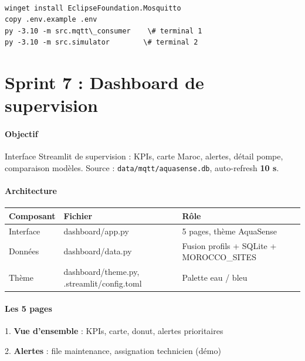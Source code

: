 \documentclass[11pt,a4paper]{report}
\begin{document}
\begin{lstlisting}

winget install EclipseFoundation.Mosquitto
copy .env.example .env
py -3.10 -m src.mqtt\_consumer    \# terminal 1
py -3.10 -m src.simulator        \# terminal 2

\end{lstlisting}





\chapter{Sprint 7 : Dashboard de supervision}



\subsubsection{Objectif}



Interface Streamlit de supervision : KPIs, carte Maroc, alertes, détail pompe, comparaison modèles. Source : \texttt{data/mqtt/aquasense.db}, auto-refresh \textbf{10 s}.



\subsubsection{Architecture}



\begin{longtable}{@{}lll@{}}
\toprule
Composant & Fichier & Rôle \\
\midrule
Interface & dashboard/app.py & 5 pages, thème AquaSense \\
Données & dashboard/data.py & Fusion profils + SQLite + MOROCCO\_SITES \\
Thème & dashboard/theme.py, .streamlit/config.toml & Palette eau / bleu \\
\bottomrule
\end{longtable}




\subsubsection{Les 5 pages}



1. \textbf{Vue d'ensemble} : KPIs, carte, donut, alertes prioritaires

2. \textbf{Alertes} : file maintenance, assignation technicien (démo)
\end{document}
